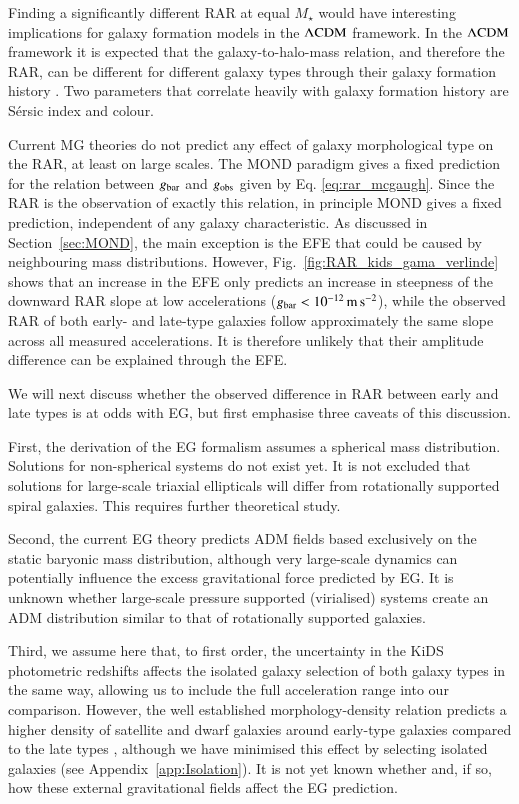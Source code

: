 \documentclass{aa}
\newcommand{\mpss}{\,{\rm m}\,{\rm s}^{-2} }
\newcommand{\lcdm}{{\rm \Lambda CDM}}
\newcommand{\un}[1]{_{\rm #1}}
\begin{document}
Finding a significantly different RAR at equal $M_\star$ would have interesting implications for galaxy formation models in the $\lcdm$ framework. In the $\lcdm$ framework it is expected that the galaxy-to-halo-mass relation, and therefore the RAR, can be different for different galaxy types through their galaxy formation history \cite[]{dutton2010,matthee2017,posti2019,marasco2020}. Two parameters that correlate heavily with galaxy formation history are S\'ersic index and colour. 

Current MG theories do not predict any effect of galaxy morphological type on the RAR, at least on large scales. The MOND paradigm gives a fixed prediction for the relation between $g\un{bar}$ and $g\un{obs}$ given by Eq. \ref{eq:rar_mcgaugh}. Since the RAR is the observation of exactly this relation, in principle MOND gives a fixed prediction, independent of any galaxy characteristic. As discussed in Section~\ref{sec:MOND}, the main exception is the EFE that could be caused by neighbouring mass distributions. However, Fig.~\ref{fig:RAR_kids_gama_verlinde} shows that an increase in the EFE only predicts an increase in steepness of the downward RAR slope at low accelerations ($g\un{bar} < 10^{-12} \mpss$), while the observed RAR of both early- and late-type galaxies follow approximately the same slope across all measured accelerations. It is therefore unlikely that their amplitude difference can be explained through the EFE.

We will next discuss whether the observed difference in RAR between early and late types is at odds with EG, but first emphasise three caveats of this discussion.

First, the derivation of the EG formalism assumes a spherical mass distribution. Solutions for non-spherical systems do not exist yet. It is not excluded that solutions for large-scale triaxial ellipticals will differ from rotationally supported spiral galaxies. This requires further theoretical study.

Second, the current EG theory predicts ADM fields based exclusively on the static baryonic mass distribution, although very large-scale dynamics can potentially influence the excess gravitational force predicted by EG. It is unknown whether large-scale pressure supported (virialised) systems create an ADM distribution similar to that of rotationally supported galaxies.

Third, we assume here that, to first order, the uncertainty in the KiDS photometric redshifts affects the isolated galaxy selection of both galaxy types in the same way, allowing us to include the full acceleration range into our comparison. However, the well established morphology-density relation predicts a higher density of satellite and dwarf galaxies around early-type galaxies compared to the late types \cite[]{dressler1980,goto2003}, although we have minimised this effect by selecting isolated galaxies (see Appendix~\ref{app:Isolation}). It is not yet known whether and, if so, how these external gravitational fields affect the EG prediction.
\end{document}
